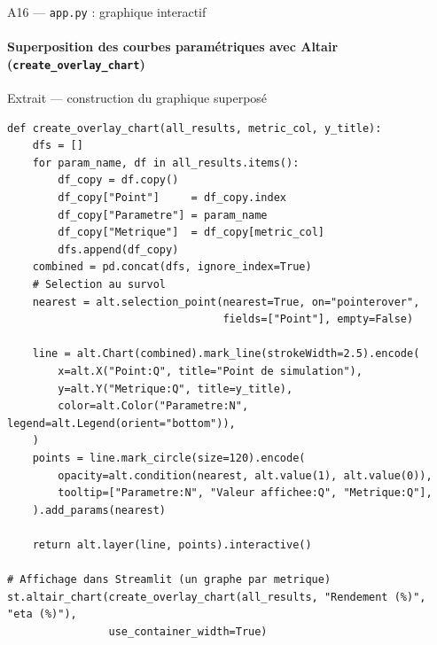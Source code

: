 \documentclass[aspectratio=43, 10pt]{beamer}
\begin{document}
\begin{frame}[fragile]{A16 --- \texttt{app.py} : graphique interactif}
  \framesubtitle{Superposition des courbes param\'etriques avec Altair (\texttt{create\_overlay\_chart})}

  \begin{exampleblock}{Extrait --- construction du graphique superpos\'e}
  \begin{lstlisting}
def create_overlay_chart(all_results, metric_col, y_title):
    dfs = []
    for param_name, df in all_results.items():
        df_copy = df.copy()
        df_copy["Point"]     = df_copy.index
        df_copy["Parametre"] = param_name
        df_copy["Metrique"]  = df_copy[metric_col]
        dfs.append(df_copy)
    combined = pd.concat(dfs, ignore_index=True)
    # Selection au survol
    nearest = alt.selection_point(nearest=True, on="pointerover",
                                  fields=["Point"], empty=False)

    line = alt.Chart(combined).mark_line(strokeWidth=2.5).encode(
        x=alt.X("Point:Q", title="Point de simulation"),
        y=alt.Y("Metrique:Q", title=y_title),
        color=alt.Color("Parametre:N", legend=alt.Legend(orient="bottom")),
    )
    points = line.mark_circle(size=120).encode(
        opacity=alt.condition(nearest, alt.value(1), alt.value(0)),
        tooltip=["Parametre:N", "Valeur affichee:Q", "Metrique:Q"],
    ).add_params(nearest)

    return alt.layer(line, points).interactive()

# Affichage dans Streamlit (un graphe par metrique)
st.altair_chart(create_overlay_chart(all_results, "Rendement (%)", "eta (%)"),
                use_container_width=True)
  \end{lstlisting}
  \end{exampleblock}

\end{frame}

\end{document}
